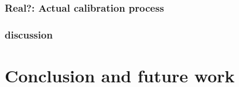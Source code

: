 \documentclass[english, printversion, nomenclature, notitle]{tuvisionthesis} %
\begin{document}
\subsection{Real?: Actual calibration process}

\subsection{discussion}

\chapter{Conclusion and future work}

{}
\end{document}

